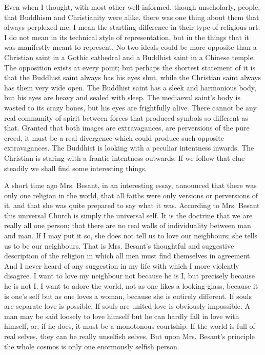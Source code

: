 \documentclass{book}
\begin{document}
Even when I thought, with most other well-informed, though unscholarly, people, that Buddhism and Christianity were alike, there was one thing about them that always perplexed me; I mean the startling difference in their type of religious art. I do not mean in its technical style of representation, but in the things that it was manifestly meant to represent. No two ideals could be more opposite than a Christian saint in a Gothic cathedral and a Buddhist saint in a Chinese temple. The opposition exists at every point; but perhaps the shortest statement of it is that the Buddhist saint always has his eyes shut, while the Christian saint always has them very wide open. The Buddhist saint has a sleek and harmonious body, but his eyes are heavy and sealed with sleep. The mediaeval saint’s body is wasted to its crazy bones, but his eyes are frightfully alive. There cannot be any real community of spirit between forces that produced symbols so different as that. Granted that both images are extravagances, are perversions of the pure creed, it must be a real divergence which could produce such opposite extravagances. The Buddhist is looking with a peculiar intentness inwards. The Christian is staring with a frantic intentness outwards. If we follow that clue steadily we shall find some interesting things.

A short time ago Mrs. Besant, in an interesting essay, announced that there was only one religion in the world, that all faiths were only versions or perversions of it, and that she was quite prepared to say what it was. According to Mrs. Besant this universal Church is simply the universal self. It is the doctrine that we are really all one person; that there are no real walls of individuality between man and man. If I may put it so, she does not tell us to love our neighbours; she tells us to be our neighbours. That is Mrs. Besant’s thoughtful and suggestive description of the religion in which all men must find themselves in agreement. And I never heard of any suggestion in my life with which I more violently disagree. I want to love my neighbour not because he is I, but precisely because he is not I. I want to adore the world, not as one likes a looking-glass, because it is one’s self but as one loves a woman, because she is entirely different. If souls are separate love is possible. If souls are united love is obviously impossible. A man may be said loosely to love himself but he can hardly fall in love with himself, or, if he does, it must be a monotonous courtship. If the world is full of real selves, they can be really unselfish selves. But upon Mrs. Besant’s principle the whole cosmos is only one enormously selfish person.
\end{document}
